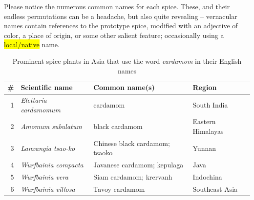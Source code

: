 \documentclass[12pt]{article}
\begin{document}
Please notice the numerous common names for each spice. These, and their endless permutations can be a headache, but also quite revealing -- vernacular names contain references to the prototype spice, modified with an adjective of color, a place of origin, or some other salient feature; occasionally using a \hl{local/native} name.

\begin{table}[ht]
    \centering
    \begin{tabularx}{\textwidth}{@{}rXll@{}}
    \toprule
    \# & \textbf{Scientific name} & \textbf{Common name(s)} & \textbf{Region} \\ \midrule
    1 & \textit{Elettaria cardamomum} & cardamom & South India \\
    2 & \textit{Amomum subulatum} & black cardamom & Eastern Himalayas \\
    3 & \textit{Lanxangia tsao-ko} & Chinese black cardamom; tsaoko & Yunnan \\
    4 & \textit{Wurfbainia compacta} & Javanese cardamom; kepulaga & Java \\ 5 & \textit{Wurfbainia vera} & Siam cardamom; krervanh & Indochina \\
    6 & \textit{Wurfbainia villosa} & Tavoy cardamom & Southeast Asia \\ \bottomrule
    \end{tabularx}
    \caption{Prominent spice plants in Asia that use the word \textit{cardamom} in their English names}
    \label{tab:cardamoms}
\end{table}


\end{document}
